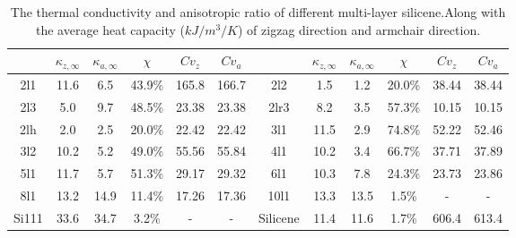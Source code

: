 \documentclass[%
 reprint,
 amsmath,amssymb,
 aps,
 prb,
]{revtex4-1}
\begin{document}
\begin{table*}
  \caption{\label{tab:table2}
    The thermal conductivity and anisotropic ratio of different multi-layer silicene.Along with the average heat capacity ($kJ/m^3/K$) of zigzag direction and armchair direction.}
  \begin{ruledtabular}
    \begin{tabular}{cccccccccccc}
            & $\kappa_{z,\infty}$
            & $\kappa_{a,\infty}$
            & $\chi$
            & $Cv_{z}$
            & $Cv_{a}$
            &
            & $\kappa_{z,\infty}$
            & $\kappa_{a,\infty}$
            & $\chi$
            & $Cv_{z}$
            & $Cv_{a}$                                                                                              \\
      \hline
      2l1   & 11.6                & 6.5  & 43.9\% & 165.8 & 166.7 & 2l2      & 1.5  & 1.2  & 20.0\% & 38.44 & 38.44 \\
      2l3   & 5.0                 & 9.7  & 48.5\% & 23.38 & 23.38 & 2lr3     & 8.2  & 3.5  & 57.3\% & 10.15 & 10.15 \\
      2lh   & 2.0                 & 2.5  & 20.0\% & 22.42 & 22.42 & 3l1      & 11.5 & 2.9  & 74.8\% & 52.22 & 52.46 \\
      3l2   & 10.2                & 5.2  & 49.0\% & 55.56 & 55.84 & 4l1      & 10.2 & 3.4  & 66.7\% & 37.71 & 37.89 \\
      5l1   & 11.7                & 5.7  & 51.3\% & 29.17 & 29.32 & 6l1      & 10.3 & 7.8  & 24.3\% & 23.73 & 23.86 \\
      8l1   & 13.2                & 14.9 & 11.4\% & 17.26 & 17.36 & 10l1     & 13.3 & 13.5 & 1.5\%  & -     & -     \\
      Si111 & 33.6                & 34.7 & 3.2\%  & -     & -     & Silicene & 11.4 & 11.6 & 1.7\%  & 606.4 & 613.4 \\
    \end{tabular}
  \end{ruledtabular}
\end{table*}
\end{document}
